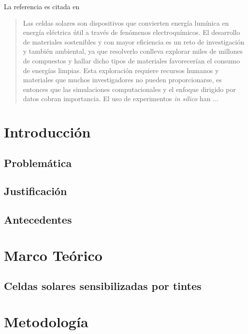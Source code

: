 \documentclass{article}
\theoremstyle{mytheoremstyle}
\theoremstyle{mytheoremstyle}
\theoremstyle{myproblemstyle}
\begin{document}
    La referencia es citada en \cite{wen2020}
    \begin{abstract}
        Las celdas solares son dispositivos que convierten energía lumínica en 
        energía eléctrica útil a través de fenómenos electroquímicos. El desarrollo
        de materiales sostenibles y con mayor eficiencia es un reto de investigación
        y también ambiental, ya que resolverlo conlleva explorar miles de millones de 
        compuestos y hallar dicho tipos de materiales favorecerían el consumo de 
        energías limpias. Esta exploración requiere recursos humanos y materiales que
        muchos investigadores no pueden proporcionarse, es entonces que las simulaciones
        computacionales y el enfoque dirigido por datos cobran importancia. El uso de 
        experimentos \textit{in silico} han ... 
    \end{abstract}

    \tableofcontents

    \newpage
    \section{Introducción}
    \subsection{Problemática}
    \subsection{Justificación}
    \subsection{Antecedentes}
    \section{Marco Teórico}
    \subsection{Celdas solares sensibilizadas por tintes}
    \section{Metodología}

    \printbibliography
\end{document}

